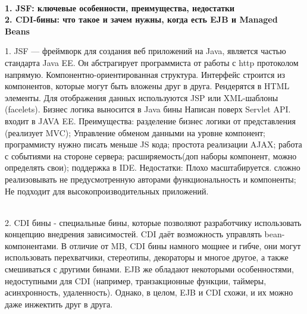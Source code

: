 \documentclass{article}
\newcommand{\bil}[4]{%
    \begin{minipage}{.3\textwidth}
        \textbf{1. #1} \\
        \textbf{2. #2}

        1. #3
        \\
        2. #4
    \end{minipage}
}
\begin{document}
\\
\bil{JSF: ключевые особенности, преимущества, недостатки}{CDI-бины: что такое и зачем нужны, когда есть EJB и Managed Beans}{
    JSF — фреймворк для создания веб приложений на Java, является частью стандарта Java EE. Он абстрагирует программиста от работы с http протоколом напрямую.
    Компонентно-ориентированная структура. Интерфейс строится из компонентов, которые могут быть вложены друг в друга. Рендерятся в HTML элементы.
    Для отображения данных используются JSP или XML-шаблоны (facelets).
    Бизнес логика выносится в Java бины
    Написан поверх Servlet API. входит в JAVA EE.
    Преимущества: разделение бизнес логики от представления (реализует MVC);
    Управление обменом данными на уровне компонент;
    программисту нужно писать меньше JS кода;
    простота реализации AJAX;
    работа с событиями на стороне сервера;
    расширяемость(доп наборы компонент, можно определять свои);
    поддержка в IDE.
    Недостатки:
    Плохо масштабируется. сложно реализовывать не предусмотренную авторами функциональность и компоненты;
    Не подходит для высокопроизводительных приложений.
}{
    CDI бины - специальные бины, которые позволяют разработчику использовать концепцию внедрения зависимостей. 
    CDI даёт возможность управлять bean-компонентами. 
    В отличие от MB, CDI бины намного мощнее и гибче, они могут использовать перехватчики, стереотипы, декораторы и многое другое, а также смешиваться с другими бинами. 
    EJB же обладают некоторыми особенностями, недоступными для CDI (например, транзакционные функции, таймеры, асинхронность, удаленность). 
    Однако, в целом, EJB и CDI схожи, и их можно даже инжектить друг в друга. 
}
\hfill
\end{document}
